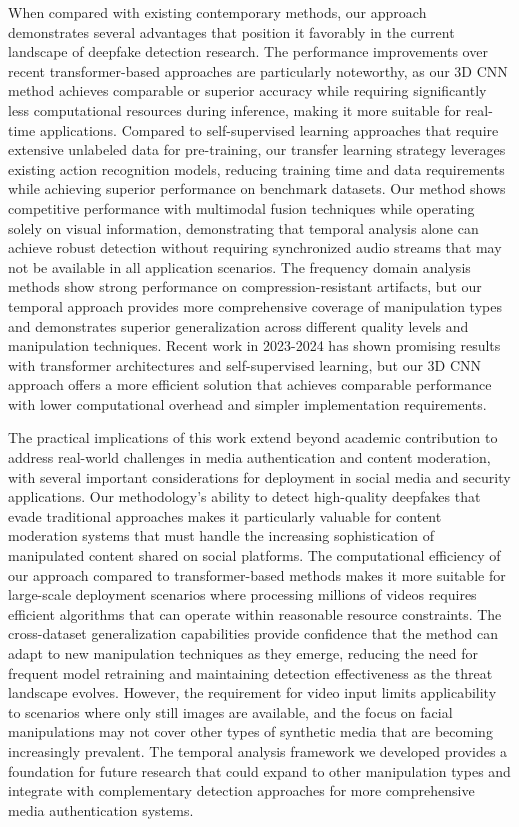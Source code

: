 \documentclass[conference]{IEEEtran}
\begin{document}
When compared with existing contemporary methods, our approach demonstrates several advantages that position it favorably in the current landscape of deepfake detection research.
The performance improvements over recent transformer-based approaches are particularly noteworthy, as our 3D CNN method achieves comparable or superior accuracy while requiring significantly less computational resources during inference, making it more suitable for real-time applications.
Compared to self-supervised learning approaches that require extensive unlabeled data for pre-training, our transfer learning strategy leverages existing action recognition models, reducing training time and data requirements while achieving superior performance on benchmark datasets.
Our method shows competitive performance with multimodal fusion techniques while operating solely on visual information, demonstrating that temporal analysis alone can achieve robust detection without requiring synchronized audio streams that may not be available in all application scenarios.
The frequency domain analysis methods show strong performance on compression-resistant artifacts, but our temporal approach provides more comprehensive coverage of manipulation types and demonstrates superior generalization across different quality levels and manipulation techniques.
Recent work in 2023-2024 has shown promising results with transformer architectures and self-supervised learning, but our 3D CNN approach offers a more efficient solution that achieves comparable performance with lower computational overhead and simpler implementation requirements.

The practical implications of this work extend beyond academic contribution to address real-world challenges in media authentication and content moderation, with several important considerations for deployment in social media and security applications.
Our methodology's ability to detect high-quality deepfakes that evade traditional approaches makes it particularly valuable for content moderation systems that must handle the increasing sophistication of manipulated content shared on social platforms.
The computational efficiency of our approach compared to transformer-based methods makes it more suitable for large-scale deployment scenarios where processing millions of videos requires efficient algorithms that can operate within reasonable resource constraints.
The cross-dataset generalization capabilities provide confidence that the method can adapt to new manipulation techniques as they emerge, reducing the need for frequent model retraining and maintaining detection effectiveness as the threat landscape evolves.
However, the requirement for video input limits applicability to scenarios where only still images are available, and the focus on facial manipulations may not cover other types of synthetic media that are becoming increasingly prevalent.
The temporal analysis framework we developed provides a foundation for future research that could expand to other manipulation types and integrate with complementary detection approaches for more comprehensive media authentication systems.
\end{document}
